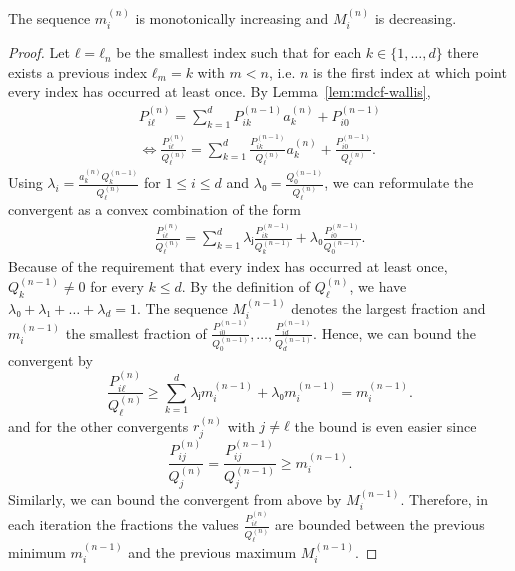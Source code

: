 \begin{lemma}
  The sequence $m_i^{(n)}$ is monotonically increasing and $M_i^{(n)}$ is decreasing.
\end{lemma}

\begin{proof}
  Let $ℓ = ℓ_n$ be the smallest index such that for each $k ∈ \{1, …, d\}$
  there exists a previous index $ℓ_m = k$ with $m < n$,
  i.e. $n$ is the first index at which point every index has occurred at least once.
  By Lemma~\ref{lem:mdcf-wallis},
  \begin{align*}
    P_{iℓ}^{(n)} = \sum_{k = 1}^d P_{ik}^{(n-1)} a_k^{(n)} + P_{i0}^{(n-1)} \\
    \iff
    \frac{P_{iℓ}^{(n)}}{Q_{ℓ}^{(n)}} = \sum_{k = 1}^d \frac{P_{ik}^{(n-1)}}{Q_ℓ^{(n)}} a_k^{(n)} + \frac{P_{i0}^{(n-1)}}{Q_ℓ^{(n)}}.
  \end{align*}
  Using $λ_i = \frac{a_k^{(n)} Q_k^{(n-1)}}{Q_ℓ^{(n)}}$ for $1 ≤ i ≤ d$ and $λ₀ = \frac{Q_0^{(n-1)}}{Q_ℓ^{(n)}}$,
  we can reformulate the convergent as a convex combination of the form
  \begin{align*}
    \frac{P_{iℓ}^{(n)}}{Q_{ℓ}^{(n)}} = \sum_{k = 1}^d λⱼ \frac{P_{ik}^{(n-1)}}{Q_k^{(n-1)}} + λ₀ \frac{P_{i0}^{(n-1)}}{Q_0^{(n-1)}}.
  \end{align*}
  Because of the requirement that every index has occurred at least once,
  $Q_k^{(n-1)} ≠ 0$ for every $k ≤ d$.
  By the definition of $Q_ℓ^{(n)}$, we have $λ₀ + λ₁ + \dots + λ_d = 1$.
  The sequence $M_i^{(n-1)}$ denotes the largest fraction and $m_i^{(n-1)}$ the smallest
  fraction of $\frac{P_{i0}^{(n-1)}}{Q_0^{(n-1)}}, …, \frac{P_{id}^{(n-1)}}{Q_d^{(n-1)}}$.
  Hence, we can bound the convergent by
  \[
    \frac{P_{iℓ}^{(n)}}{Q_{ℓ}^{(n)}} ≥ \sum_{k=1}^d λⱼ m_i^{(n-1)} + λ₀ m_i^{(n-1)} = m_i^{(n-1)}.
  \]
  and for the other convergents $r_j^{(n)}$ with $j ≠ ℓ$ the bound is even easier since
  \[
    \frac{P_{ij}^{(n)}}{Q_j^{(n)}} = \frac{P_{ij}^{(n-1)}}{Q_j^{(n-1)}} ≥ m_i^{(n-1)}.
  \]
  Similarly, we can bound the convergent from above by $M_i^{(n-1)}$.
  Therefore, in each iteration the fractions the values $\frac{P_{iℓ}^{(n)}}{Q_ℓ^{(n)}}$ are
  bounded between the previous minimum $m_i^{(n-1)}$ and the previous maximum
  $M_i^{(n-1)}$.
\end{proof}

